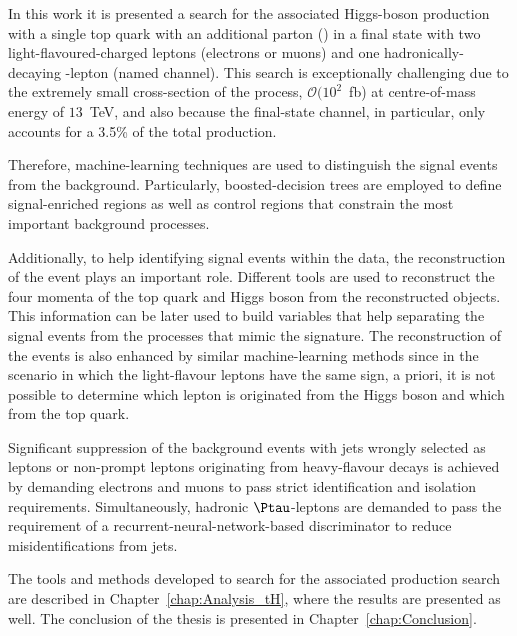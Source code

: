 In this work it is presented a search for the associated Higgs-boson production with 
a single top quark with an additional parton (\tHq) in a final state with two light-flavoured-charged 
leptons (electrons or muons) and one hadronically-decaying \Ptau-lepton (named \dileptau channel).
This search is exceptionally challenging due to the extremely small cross-section of the \tHq process, $\mathcal{O}(10^2$~fb) 
at centre-of-mass energy of $13$~TeV, 
and also because the \dileptau final-state channel, in particular, only accounts 
for a 3.5\% of the total \tHq production. 

Therefore, machine-learning techniques are used to distinguish the \tHq signal events from 
the background. Particularly, boosted-decision trees are employed to define signal-enriched regions as well
as control regions that constrain the most important background processes. 

Additionally, to help identifying signal events within the data, the reconstruction of the event plays an important role. 
Different tools are used to reconstruct the four momenta of the top quark and Higgs boson from the 
reconstructed objects. This information can be later used to build variables that help separating the
signal events from the processes that mimic the \dileptau signature. 
The reconstruction of the events is also enhanced by similar machine-learning methods
since in the scenario in which the light-flavour leptons have the same sign, a priori, 
it is not possible to determine which lepton is originated from the Higgs boson and 
which from the top quark. 

Significant suppression of the background events with jets wrongly selected as leptons 
or non-prompt leptons originating from heavy-flavour decays
is achieved by demanding electrons and muons to pass strict identification and isolation requirements. 
Simultaneously, hadronic $\Ptau$-leptons are demanded to pass the requirement of a
recurrent-neural-network-based discriminator to reduce misidentifications from jets.

The tools and methods developed to search for the associated \tHq production 
search are described in Chapter~\ref{chap:Analysis_tH}, where the results
are presented as well. The conclusion of the thesis is presented in Chapter~\ref{chap:Conclusion}.



